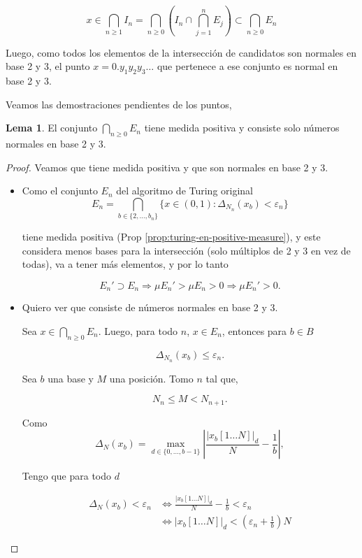 \documentclass{article}
\theoremstyle{definition} %
\newtheorem*{lemma*}{Lema}
\begin{document}
\[
    x \in 
    \bigcap_{n \geq 1} I_n 
    = \bigcap_{n \geq 0} \left( I_n \cap \bigcap^n_{j = 1} E_j \right)
    \subset \bigcap_{n \geq 0} E_n
\]

Luego, como todos los elementos de la intersección de candidatos son
normales en base 2 y 3, el punto $x = 0.y_1 y_2 y_3 \ldots$ que pertenece a
ese conjunto es normal en base 2 y 3.

Veamos las demostraciones pendientes de los puntos,

\begin{lemma*}
    El conjunto $\bigcap_{n \geq 0} E_n$ tiene medida positiva y consiste solo
    números normales en base 2 y 3.
\end{lemma*}
\begin{proof} Veamos que tiene medida positiva y que son normales en base 2 y 3.
    \begin{itemize}
        \item Como el conjunto $E_n$ del algoritmo de Turing original
        $$E_n = \bigcap_{b \in \{2, \dots, b_n\}} \{ x \in (0, 1) :
        \Delta_{N_n}(x_b) < \varepsilon_n\}$$
        
        tiene medida positiva (Prop \ref{prop:turing-en-positive-measure}), y
        este considera menos bases para la intersección (solo múltiplos de 2 y 3
        en vez de todas), va a tener más elementos, y por lo tanto

        $$E_n' \supset E_n \Rightarrow \mu E_n' > \mu E_n > 0 \Rightarrow \mu
        E_n'> 0.$$

        \item Quiero ver que consiste de números normales en base 2 y 3.
        
        Sea $x \in \bigcap_{n \geq 0} E_n$. Luego, para todo $n$, $x \in E_n$,
        entonces para $b \in B$

        $$\Delta_{N_n}(x_b) \leq \varepsilon_n.$$

        Sea $b$ una base y $M$ una posición. Tomo $n$ tal que,

        $$N_n \leq M < N_{n + 1}.$$

        Como 
        $$\Delta_N(x_b) = \max_{d \in \{ 0, \dots, b-1 \}}
        \left|
            \frac{|x_b[1\dots N]|_d}{N} - \frac{1}{b}
        \right|,$$

        Tengo que para todo $d$

        \begin{align*}
            \Delta_N(x_b) < \varepsilon_n
            &\Leftrightarrow 
                \frac{|x_b[1\dots N]|_d}{N} - \frac{1}{b} < \varepsilon_n\\
            &\Leftrightarrow
            |x_b[1\dots N]|_d < \left(\varepsilon_n + \frac{1}{b}\right) N
        \end{align*}



\end{itemize}
\end{proof}
\end{document}
